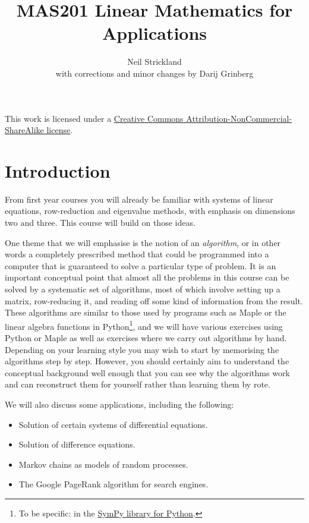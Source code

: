 \documentclass[reqno]{amsart}
\theoremstyle{definition}
\begin{document}
\title{MAS201 Linear Mathematics for Applications}
\author{Neil Strickland \\ with corrections and minor changes by Darij Grinberg}

\maketitle

\begin{center}
 This work is licensed under a 
 \href{https://creativecommons.org/licenses/by-nc-sa/3.0/deed.en}{%
  Creative Commons Attribution-NonCommercial-ShareAlike license}.
 
 \bigskip

 \doclicenseImage 
\end{center}

\tableofcontents 

\section{Introduction}
\label{sec-intro}

From first year courses you will already be familiar with systems of
linear equations, row-reduction and eigenvalue methods, with emphasis
on dimensions two and three.  This course will build on those ideas.  

One theme that we will emphasise is the notion of an \emph{algorithm},
or in other words a completely prescribed method that could be
programmed into a computer that is guaranteed to solve a particular
type of problem.  It is an important conceptual point that almost all
the problems in this course can be solved by a systematic set of
algorithms, most of which involve setting up a matrix, row-reducing
it, and reading off some kind of information from the result.  These
algorithms are similar to those used by programs such as Maple or the
linear algebra functions in Python\footnote{To be specific: in the
\href{http://sympy.org}{SymPy library for Python}.},
and we will have various exercises
using Python or Maple as well as exercises where we carry out
algorithms by hand.  Depending on your learning style you may wish to
start by memorising the algorithms step by step.  However, you should
certainly aim to understand the conceptual background well enough that
you can see why the algorithms work and can reconstruct them for
yourself rather than learning them by rote.

We will also discuss some applications, including the following:
\begin{itemize}
 \item Solution of certain systems of differential equations.
 \item Solution of difference equations.
 \item Markov chains as models of random processes.
 \item The Google PageRank algorithm for search engines.
\end{itemize}
\end{document}
